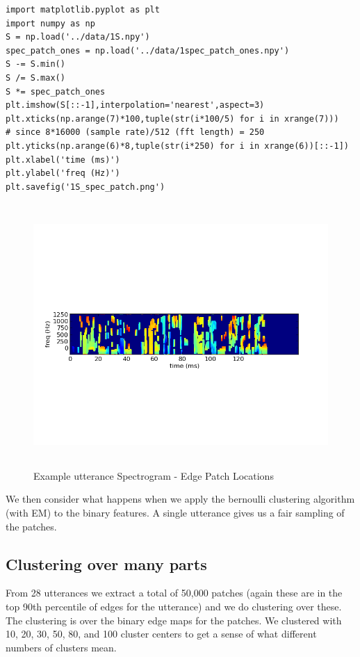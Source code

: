 \documentclass[11pt]{article}
\begin{document}
\begin{verbatim}
import matplotlib.pyplot as plt
import numpy as np
S = np.load('../data/1S.npy')
spec_patch_ones = np.load('../data/1spec_patch_ones.npy')
S -= S.min()
S /= S.max()
S *= spec_patch_ones
plt.imshow(S[::-1],interpolation='nearest',aspect=3)
plt.xticks(np.arange(7)*100,tuple(str(i*100/5) for i in xrange(7)))
# since 8*16000 (sample rate)/512 (fft length) = 250
plt.yticks(np.arange(6)*8,tuple(str(i*250) for i in xrange(6))[::-1])
plt.xlabel('time (ms)')
plt.ylabel('freq (Hz)')
plt.savefig('1S_spec_patch.png')
\end{verbatim}

\begin{figure}[htb]
\centering
\includegraphics[height=10cm]{./1S_spec_patch.png}
\caption{\label{fig:1S_spec_patch}Example utterance Spectrogram - Edge Patch Locations}
\end{figure}


We then consider what happens when we apply the bernoulli clustering
algorithm (with EM) to the binary features.  A single utterance gives
us a fair sampling of the patches.
\subsection{Clustering over many parts}
\label{sec-2-2}

 
   From 28 utterances we extract a total of 50,000 patches (again
   these are in the top 90th percentile of edges for the utterance)
   and we do clustering over these.  The clustering is over the binary
   edge maps for the patches.  We clustered with 10, 20, 30, 50, 80,
   and 100 cluster centers to get a sense of what different numbers of
   clusters mean.
\end{document}
